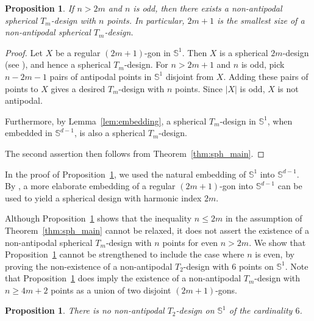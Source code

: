 \documentclass[11pt]{amsart}
\newtheorem{prop}[thm]{Proposition}
\theoremstyle{definition}
\begin{document}
\begin{prop}
\label{prop:sph_opt}
If \( n > 2m \) and \( n \) is odd, then
there exists a non-antipodal spherical $T_m$-design
with $n$ points.
In particular, $2m+1$ is the smallest size of a non-antipodal
spherical $T_m$-design.
\end{prop}
\begin{proof}
Let $X$ be a regular $(2m+1)$-gon in $\mathbb{S}^1$.
Then $X$ is a spherical $2m$-design (see \cite{MR679209}),
and hence a spherical $T_m$-design. 
For $n>2m+1$ and $n$ is odd, 
pick $n-2m-1$ pairs of antipodal points in $\mathbb{S}^{1}$ disjoint from $X$.
Adding these pairs of points to $X$ gives
a desired $T_m$-design with $n$ points.
Since $|X|$ is odd, $X$ is not antipodal.

Furthermore, by Lemma~\ref{lem:embedding}, a spherical $T_m$-design in $\mathbb{S}^1$,
when embedded in $\mathbb{S}^{d-1}$, is also a spherical $T_m$-design.

The second assertion then follows from Theorem~\ref{thm:sph_main}.
\end{proof}

In the proof of Proposition~\ref{prop:sph_opt}, we used the natural embedding
of $\mathbb{S}^{1}$ into $\mathbb{S}^{d-1}$. 
By \cite[Theorem~1.1]{MR3339051}, a more elaborate embedding 
of a regular $(2m+1)$-gon into $\mathbb{S}^{d-1}$ can be used to yield
a spherical design with harmonic index $2m$.

Although Proposition~\ref{prop:sph_opt} shows that the inequality $n\leq 2m$
in the assumption of Theorem~\ref{thm:sph_main} cannot be relaxed,
it does not assert the existence of a non-antipodal spherical $T_{m}$-design with
$n$ points for even $n>2m$.
We show that Proposition~\ref{prop:sph_opt} cannot be
strengthened
to include the case where $n$ is even, by proving the non-existence
of a non-antipodal $T_2$-design with $6$ points on $\mathbb{S}^1$.
Note that Proposition~\ref{prop:sph_opt} does imply the existence of a
non-antipodal $T_m$-design with $n\geq4m+2$ points as a union of two disjoint $(2m+1)$-gons.
\begin{prop}
There is no non-antipodal $T_2$-design on $\mathbb{S}^1$ of the cardinality $6$.
\end{prop}
\end{document}

